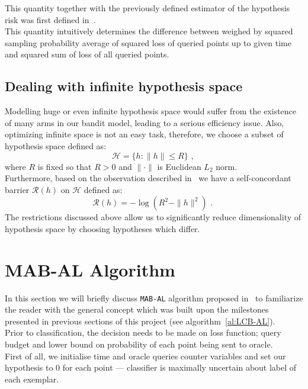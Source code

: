 \documentclass[12pt, a4paper, pdflatex, leqno, twoside]{report}
\begin{document}
This quantity together with the previously defined estimator of the hypothesis risk 
was first defined in~\citep{DBLP:journals/corr/GantiG13}.\\
This quantity intuitively determines the difference between weighed by squared sampling probability average of squared loss of queried points up to given time and squared sum of loss of all queried points.\\

\subsection{Dealing with infinite hypothesis space}
Modelling huge or even infinite hypothesis space would suffer from the existence of 
many arms in our bandit model, leading to a serious efficiency issue. Also, 
optimizing infinite space is not an easy task, therefore, we choose a subset of 
hypothesis space defined as:
$$
\mathscr{H} = \{ h : \|h\| \leq R \} \text{~,~}
$$
where $R$ is fixed so that $R > 0$ and $\| \cdot \|$ is Euclidean $L_2$ norm.\\
Furthermore, based on the observation described in~\citep{Abernethy08competingin} 
we have a self-concordant barrier $\mathscr{R}(h)$ on $\mathscr{H}$ defined as:
$$
\mathscr{R}(h) = - \log(R^2 - \|h\|^2) \text{~.~}
$$
The restrictions discussed above allow us to significantly reduce dimensionality of 
hypothesis space by choosing hypotheses which differ.\\


\section{MAB-AL Algorithm}

In this section we will briefly discuss \texttt{MAB-AL} algorithm proposed 
in~\citep{DBLP:journals/corr/GantiG13} to familiarize the reader with the general 
concept which was built upon the milestones presented in previous sections of this project (see 
algorithm~\ref{al:LCB-AL}). 
\\Prior to classification, the decision needs to be 
made on loss function; query budget and lower bound on probability of each 
point being sent to oracle.\\

First of all, we initialise time and oracle queries counter variables and set 
our hypothesis to $0$ for each point --- classifier is maximally uncertain 
about label of each exemplar.\\
\end{document}
